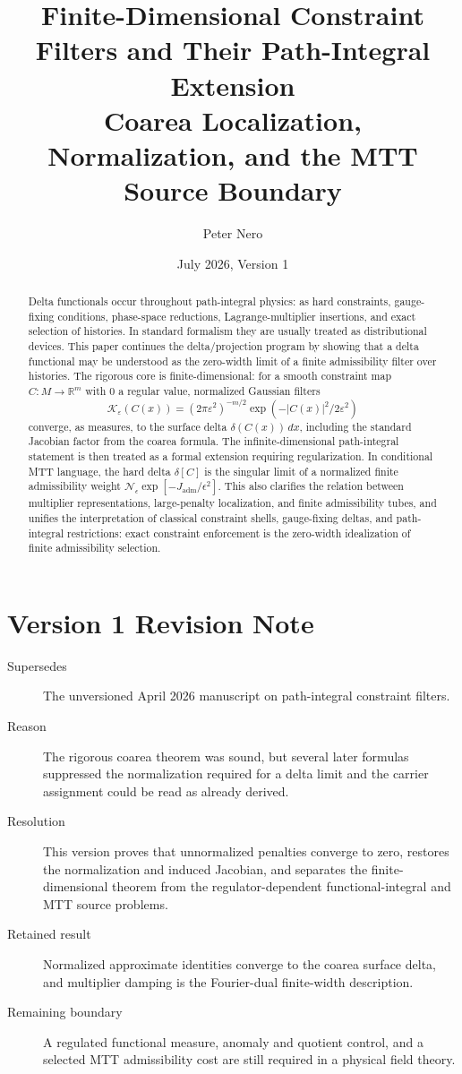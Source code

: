 \documentclass[11pt]{article}
\title{Finite-Dimensional Constraint Filters and Their Path-Integral Extension\\
\large Coarea Localization, Normalization, and the MTT Source Boundary}
\author{Peter Nero}
\date{July 2026, Version 1}
\begin{document}
\maketitle

\begin{abstract}
Delta functionals occur throughout path-integral physics: as hard constraints, gauge-fixing conditions,
phase-space reductions, Lagrange-multiplier insertions, and exact selection of histories.  In standard
formalism they are usually treated as distributional devices.  This paper continues the delta/projection
program by showing that a delta functional may be understood as the zero-width limit of a finite
admissibility filter over histories.  The rigorous core is finite-dimensional: for a smooth constraint map
\(C:M\to\mathbb R^m\) with \(0\) a regular value, normalized Gaussian filters
\[
\mathcal K_\varepsilon(C(x))=(2\pi\varepsilon^2)^{-m/2}\exp(-|C(x)|^2/2\varepsilon^2)
\]
converge, as measures, to the surface delta \(\delta(C(x))\,dx\), including the standard Jacobian factor
from the coarea formula.  The infinite-dimensional path-integral statement is then treated as a formal
extension requiring regularization.  In conditional MTT language, the hard delta
\(\delta[C]\) is the singular limit of a normalized finite admissibility weight
\(\mathcal N_\epsilon\exp[-J_{\mathrm{adm}}/\epsilon^2]\).  This also clarifies the relation between multiplier representations, large-penalty localization, and finite admissibility tubes, and unifies the
interpretation of classical constraint shells, gauge-fixing deltas, and path-integral restrictions:
exact constraint enforcement is the zero-width idealization of finite admissibility selection.
\end{abstract}

\section*{Version 1 Revision Note}
\begin{description}
\item[Supersedes] The unversioned April 2026 manuscript on path-integral constraint filters.
\item[Reason] The rigorous coarea theorem was sound, but several later formulas suppressed
the normalization required for a delta limit and the carrier assignment could be read as
already derived.
\item[Resolution] This version proves that unnormalized penalties converge to zero,
restores the normalization and induced Jacobian, and separates the finite-dimensional
theorem from the regulator-dependent functional-integral and MTT source problems.
\item[Retained result] Normalized approximate identities converge to the coarea surface
delta, and multiplier damping is the Fourier-dual finite-width description.
\item[Remaining boundary] A regulated functional measure, anomaly and quotient control,
and a selected MTT admissibility cost are still required in a physical field theory.
\end{description}
\end{document}
